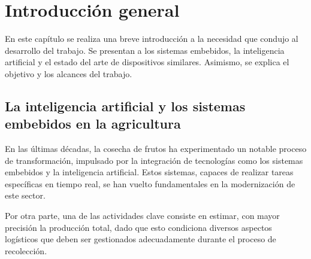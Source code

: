 
\chapter{Introducción general} %

\label{Chapter1} %
\label{IntroGeneral}

En este capítulo se realiza una breve introducción a la necesidad que condujo al desarrollo del trabajo. Se presentan a los sistemas embebidos, la inteligencia artificial y el estado del arte de dispositivos similares. Asimismo, se explica el objetivo y los alcances del trabajo.


\newcommand{\keyword}[1]{\textbf{#1}}
\newcommand{\tabhead}[1]{\textbf{#1}}
\newcommand{\code}[1]{\texttt{#1}}
\newcommand{\file}[1]{\texttt{\bfseries#1}}
\newcommand{\option}[1]{\texttt{\itshape#1}}
\newcommand{\grados}{$^{\circ}$}



\section{La inteligencia artificial y los sistemas embebidos en la agricultura}

En las últimas décadas, la cosecha de frutos ha experimentado un notable proceso de transformación, impulsado por la integración de tecnologías como los sistemas embebidos y la inteligencia artificial. Estos sistemas, capaces de realizar tareas específicas en tiempo real, se han vuelto fundamentales en la modernización de este sector.

Por otra parte, una de las actividades clave consiste en estimar, con mayor precisión la producción total, dado que esto condiciona diversos aspectos logísticos que deben ser gestionados adecuadamente durante el proceso de recolección.

